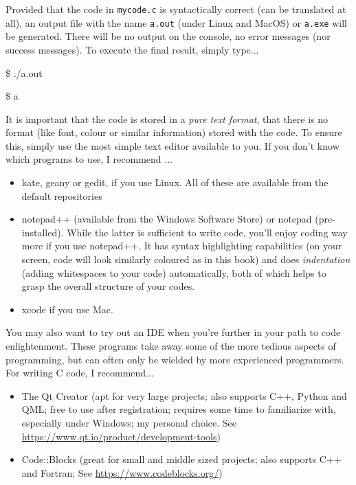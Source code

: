 Provided that the code in \texttt{mycode.c} is syntactically correct (\ie can be translated at all), an output file with the name \texttt{a.out} (under Linux and MacOS) or \texttt{a.exe} will be generated. There will be no output on the console, \ie no error messages (nor success messages). To execute the final result, simply type...
\begin{tcbraster}[raster columns=2,
                  raster equal height,
                  nobeforeafter,
                  raster column skip=0.2cm]
\begin{cmdbox}
\$ ./a.out
\end{cmdbox}
%
\begin{cmdbox}
\$ a
\end{cmdbox}
\end{tcbraster}

\begin{hintbox}
It is important that the code is stored in a \emph{pure text format}, \ie that there is no format (like font, colour or similar information) stored with the code. To ensure this, simply use the most simple text editor available to you. If you don't know which programs to use, I recommend ...
\begin{itemize}
\item kate, geany or gedit, if you use Linux. All of these are available from the default repositories
\item notepad++ (available from the Windows Software Store) or notepad (pre-installed). While the latter is sufficient to write code, you'll enjoy coding way more if you use notepad++.
	It has syntax highlighting capabilities (\ie on your screen, code will look similarly coloured as in this book) and does
	\emph{indentation} (adding whitespaces to your code) automatically, both of which helps to grasp the overall structure of your codes.
\item xcode if you use Mac.
\end{itemize}

You may also want to try out an IDE when you're further in your path to code enlightenment. These programs take away some of the more tedious aspects of programming, but can often only be wielded by more experienced programmers. For writing C code, I recommend...
\begin{itemize}
\item The Qt Creator (apt for very large projects; also supports C++, Python and QML; free to use after registration; requires some time to familiarize with, especially under Windows;
	my personal choice. See \url{https://www.qt.io/product/development-tools})
\item Code::Blocks (great for small and middle sized projects; also supports C++ and Fortran;  See \url{https://www.codeblocks.org/})
\end{itemize}
\end{hintbox}

